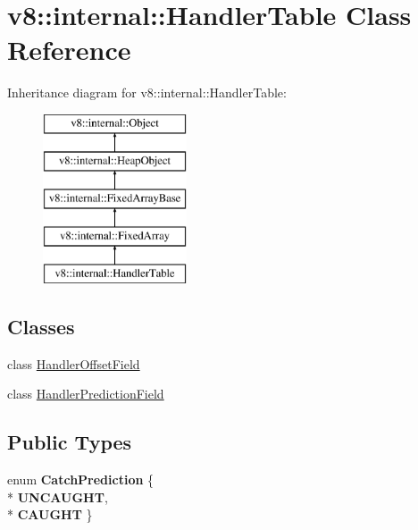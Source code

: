 \hypertarget{classv8_1_1internal_1_1_handler_table}{}\section{v8\+:\+:internal\+:\+:Handler\+Table Class Reference}
\label{classv8_1_1internal_1_1_handler_table}
Inheritance diagram for v8\+:\+:internal\+:\+:Handler\+Table\+:\begin{figure}[H]
\begin{center}
\leavevmode
\includegraphics[height=5.000000cm]{classv8_1_1internal_1_1_handler_table}
\end{center}
\end{figure}
\subsection*{Classes}
\begin{DoxyCompactItemize}
\item 
class \hyperlink{classv8_1_1internal_1_1_handler_table_1_1_handler_offset_field}{Handler\+Offset\+Field}
\item 
class \hyperlink{classv8_1_1internal_1_1_handler_table_1_1_handler_prediction_field}{Handler\+Prediction\+Field}
\end{DoxyCompactItemize}
\subsection*{Public Types}
\begin{DoxyCompactItemize}
\item 
enum {\bfseries Catch\+Prediction} \{ \\*
{\bfseries U\+N\+C\+A\+U\+G\+HT}, 
\\*
{\bfseries C\+A\+U\+G\+HT}
 \}\hypertarget{classv8_1_1internal_1_1_handler_table_a1d4e928c63ab7c79779838058fdf8435}{}\label{classv8_1_1internal_1_1_handler_table_a1d4e928c63ab7c79779838058fdf8435}

\end{DoxyCompactItemize}
